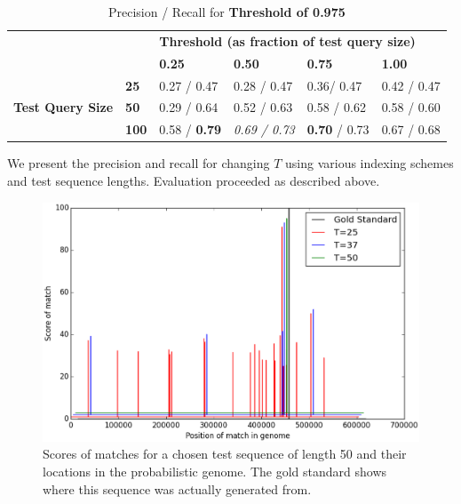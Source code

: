 \documentclass[12pt]{IEEEtran}
\begin{document}
\begin{table}[]
\centering
\caption{Precision / Recall for \textbf{Threshold of 0.975}}
\label{t975}
\begin{tabular}{ll|llll}
\cline{3-6}
                                                       &              & \multicolumn{4}{l|}{\textbf{Threshold (as fraction of test query size)}}                                                                          \\ \cline{3-6} 
\textbf{}                                              &              & \multicolumn{1}{l|}{\textbf{0.25}} & \multicolumn{1}{l|}{\textbf{0.50}} & \multicolumn{1}{l|}{\textbf{0.75}} & \multicolumn{1}{l|}{\textbf{1.00}} \\ \hline
\multicolumn{1}{|l|}{\multirow{3}{*}{\textbf{Test Query Size}}} & \textbf{25}  & 0.27 / 0.47                        & 0.28 / 0.47                         & 0.36/ 0.47                       & 0.42 / 0.47                      \\ \cline{2-2}
\multicolumn{1}{|l|}{}                                 & \textbf{50}  & 0.29 / 0.64                        & 0.52 / 0.63                         & 0.58 / 0.62                         & 0.58 / 0.60                        \\ \cline{2-2}
\multicolumn{1}{|l|}{}                                 & \textbf{100} & 0.58 / \textbf{0.79}                          & \emph{0.69 / 0.73}                    & \textbf{0.70} / 0.73                         & 0.67 / 0.68                        \\ \cline{1-2}
\end{tabular}
\end{table}

We present the precision and recall for changing $T$ using various indexing schemes and test sequence lengths. Evaluation proceeded as described above.

\begin{figure}
    \centering
    \includegraphics[scale=0.4]{dists}
    \caption{Scores of matches for a chosen test sequence of length 50 and their locations in the probabilistic genome. The gold standard shows where this sequence was actually generated from.}
    \label{dists}
\end{figure}
\end{document}
